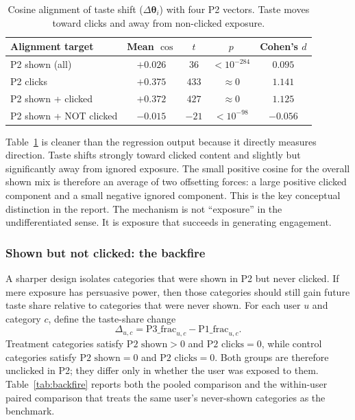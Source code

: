 \documentclass[11pt]{article}
\begin{document}
\begin{table}[ht]
\centering
\caption{Cosine alignment of taste shift ($\Delta\boldsymbol{\theta}_i$) with four P2 vectors. Taste moves toward clicks and away from non-clicked exposure.}
\label{tab:cosine_alignment}
\begin{tabular}{lcccc}
\toprule
Alignment target & Mean $\cos$ & $t$ & $p$ & Cohen's $d$ \\
\midrule
P2 shown (all) & $+0.026$ & $36$ & $< 10^{-284}$ & $0.095$ \\
P2 clicks & $+0.375$ & $433$ & $\approx 0$ & $1.141$ \\
P2 shown + clicked & $+0.372$ & $427$ & $\approx 0$ & $1.125$ \\
P2 shown + NOT clicked & $\mathbf{-0.015}$ & $-21$ & $< 10^{-98}$ & $-0.056$ \\
\bottomrule
\end{tabular}
\end{table}
\FloatBarrier

Table~\ref{tab:cosine_alignment} is cleaner than the regression output because it directly measures direction. Taste shifts strongly toward clicked content and slightly but significantly away from ignored exposure. The small positive cosine for the overall shown mix is therefore an average of two offsetting forces: a large positive clicked component and a small negative ignored component. This is the key conceptual distinction in the report. The mechanism is not ``exposure'' in the undifferentiated sense. It is exposure that succeeds in generating engagement.

\subsubsection{Shown but not clicked: the backfire}
\label{sec:shown_not_clicked}

A sharper design isolates categories that were shown in P2 but never clicked. If mere exposure has persuasive power, then those categories should still gain future taste share relative to categories that were never shown. For each user $u$ and category $c$, define the taste-share change
\[
\Delta_{u,c} = \text{P3\_frac}_{u,c} - \text{P1\_frac}_{u,c}.
\]
Treatment categories satisfy $\text{P2 shown}>0$ and $\text{P2 clicks}=0$, while control categories satisfy $\text{P2 shown}=0$ and $\text{P2 clicks}=0$. Both groups are therefore unclicked in P2; they differ only in whether the user was exposed to them. Table~\ref{tab:backfire} reports both the pooled comparison and the within-user paired comparison that treats the same user's never-shown categories as the benchmark.
\end{document}
